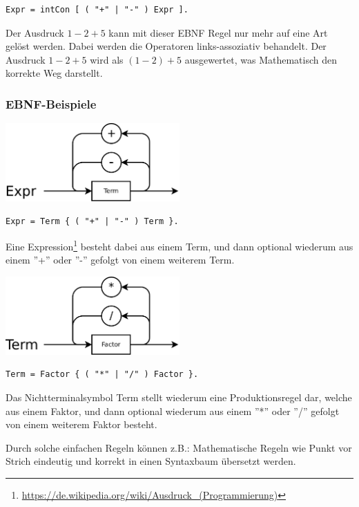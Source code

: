 \begin{lstlisting}[language=EBNF]
Expr = intCon [ ( "+" | "-" ) Expr ].
\end{lstlisting}

Der Ausdruck $1-2+5$ kann mit dieser EBNF Regel nur mehr auf eine Art gelöst werden. Dabei werden die Operatoren links-assoziativ behandelt. Der Ausdruck $1-2+5$ wird als $(1-2)+5$ ausgewertet, was Mathematisch den korrekte Weg darstellt.

\subsubsection{EBNF-Beispiele}

\includegraphics[width=0.5\textwidth]{./media/images/compiler/ebnf_expr.png}

\begin{lstlisting}[language=EBNF]
Expr = Term { ( "+" | "-" ) Term }.
\end{lstlisting}

Eine Expression\footnote{\url{https://de.wikipedia.org/wiki/Ausdruck_(Programmierung)}} besteht dabei aus einem Term, und dann optional wiederum aus einem ''+'' oder ''-'' gefolgt von einem weiterem Term.

\includegraphics[width=0.5\textwidth]{./media/images/compiler/ebnf_term.png}
\begin{lstlisting}[language=EBNF]
Term = Factor { ( "*" | "/" ) Factor }.
\end{lstlisting}

Das Nichtterminalsymbol Term stellt wiederum eine Produktionsregel dar, welche aus einem Faktor, und dann optional wiederum aus einem ''*'' oder ''/'' gefolgt von einem weiterem Faktor besteht.

Durch solche einfachen Regeln können z.B.: Mathematische Regeln wie Punkt vor Strich eindeutig und korrekt in einen Syntaxbaum übersetzt werden.

